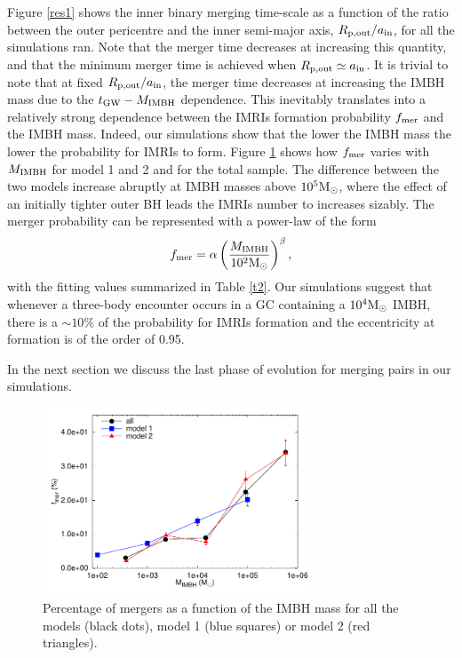 \documentclass[twocolumn]{aastex62}
\newcommand{\Ms}{{\rm M}_\odot}
\newcommand{\gw}{{\rm GW}}
\newcommand{\ibh}{{\rm IMBH}}
\newcommand{\inn}{{\rm in}}
\newcommand{\out}{{\rm out}}
\begin{document}
Figure \ref{res1} shows the inner binary merging time-scale as a function of the ratio between the outer pericentre and the inner semi-major axis, $R_{\rm p,\out} / a_\inn$, for all the simulations ran. Note that the merger time decreases at increasing this quantity, and that the minimum merger time is achieved when $R_{\rm p, \out} \simeq a_\inn$. It is trivial to note that at fixed $R_{\rm p,\out} / a_\inn$, the merger time decreases at increasing the IMBH mass due to the $t_\gw-M_\ibh$ dependence. This inevitably translates into a relatively strong dependence between the IMRIs formation probability $f_{\rm mer}$ and the IMBH mass. Indeed, our simulations show that the lower the IMBH mass the lower the probability for IMRIs to form. Figure \ref{F5} shows how $f_{\rm mer}$ varies with $M_{\ibh}$ for model 1 and 2 and for the total sample. 
The difference between the two models increase abruptly at IMBH masses above $10^5\Ms$, where the effect of an initially tighter outer BH leads the IMRIs number to increases sizably. The merger probability can be represented with a power-law of the form
\begin{equation}
f_{\rm mer} = \alpha \left(\frac{M_\ibh}{10^2\Ms}\right)^\beta,
\end{equation}  
with the fitting values summarized in Table \ref{t2}. 
Our simulations suggest that whenever a three-body encounter occurs in a GC containing a $10^4\Ms$ IMBH, there is a $\sim 10\%$ of the probability for IMRIs formation and the eccentricity at formation is of the order of 0.95. 

In the next section we discuss the last phase of evolution for merging pairs in our simulations.

\begin{figure}
\centering 
\includegraphics[width=8cm]{mergers}
\caption{Percentage of mergers as a function of the IMBH mass for all the models (black dots), model 1 (blue squares) or model 2 (red triangles).}
\label{F5}
\end{figure}
\end{document}
